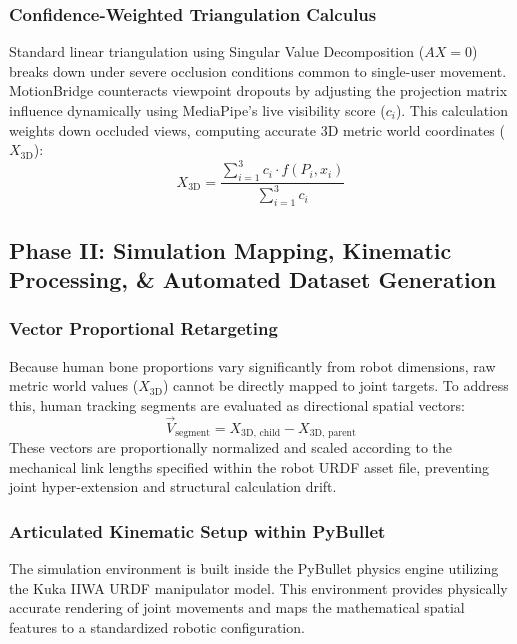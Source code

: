 \subsubsection{Confidence-Weighted Triangulation Calculus}
Standard linear triangulation using Singular Value Decomposition ($AX = 0$) breaks down under severe occlusion conditions common to single-user movement. MotionBridge counteracts viewpoint dropouts by adjusting the projection matrix influence dynamically using MediaPipe's live visibility score ($c_i$). This calculation weights down occluded views, computing accurate 3D metric world coordinates ($X_{\text{3D}}$):
\begin{equation}
X_{\text{3D}} = \frac{\sum_{i=1}^{3} c_i \cdot f(P_i, x_i)}{\sum_{i=1}^{3} c_i}
\label{eq:4-3}
\end{equation}

\subsection{Phase II: Simulation Mapping, Kinematic Processing, \& Automated Dataset Generation}
\subsubsection{Vector Proportional Retargeting}
Because human bone proportions vary significantly from robot dimensions, raw metric world values ($X_{\text{3D}}$) cannot be directly mapped to joint targets. To address this, human tracking segments are evaluated as directional spatial vectors:
\begin{equation}
\vec{V}_{\text{segment}} = X_{\text{3D, child}} - X_{\text{3D, parent}}
\label{eq:4-4}
\end{equation}
These vectors are proportionally normalized and scaled according to the mechanical link lengths specified within the robot URDF asset file, preventing joint hyper-extension and structural calculation drift.

\subsubsection{Articulated Kinematic Setup within PyBullet}
The simulation environment is built inside the PyBullet physics engine utilizing the Kuka IIWA URDF manipulator model. This environment provides physically accurate rendering of joint movements and maps the mathematical spatial features to a standardized robotic configuration.

